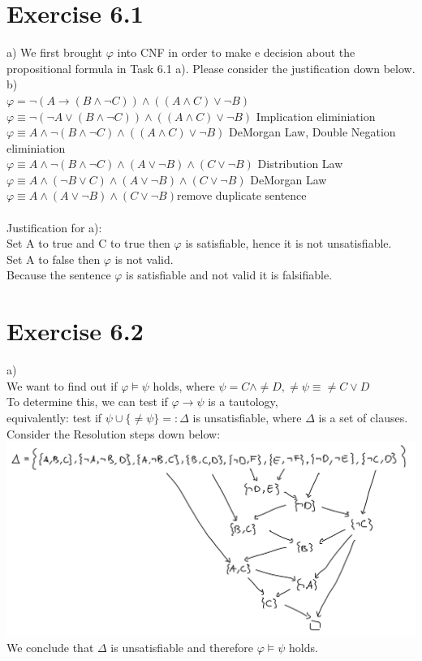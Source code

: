 \documentclass[12pt]{article}
\begin{document}
\section*{Exercise 6.1}
a) We first brought $\varphi$ into CNF in order to make e decision about the propositional formula in Task 6.1 a). Please consider the justification down below.\\
b) \\
$\varphi = \lnot (A \to (B \land \lnot C)) \land ((A \land C ) \lor \lnot B)$\\
$\varphi \equiv \lnot (\lnot A \lor (B \land \lnot C)) \land ((A \land C) \lor \lnot B)$ \qquad Implication eliminiation\\
$\varphi \equiv A \land \lnot (B \land \lnot C) \land ((A \land C) \lor \lnot B)$ \qquad DeMorgan Law, Double Negation eliminiation\\
$\varphi \equiv A \land \lnot (B \land \lnot C) \land (A \lor \lnot B) \land (C \lor \lnot B)$ \qquad Distribution Law\\
$\varphi \equiv A \land (\lnot B \lor C) \land (A \lor \lnot B) \land (C \lor \lnot B)$ \qquad DeMorgan Law\\
$\varphi \equiv A \land (A \lor \lnot B) \land (C \lor \lnot B)$\qquad remove duplicate sentence\\ \\
Justification for a):\\
Set A to true and C to true then $\varphi$ is satisfiable, hence it is not unsatisfiable.\\
Set A to false then $\varphi$ is not valid.\\
Because the sentence $\varphi$ is satisfiable and not valid it is falsifiable.


\section*{Exercise 6.2}
a)\\
We want to find out if $\varphi \vDash \psi$ holds, where $\psi = C \land \neq D, \neq \psi \equiv \neq C \lor D$\\
To determine this, we can test if $\varphi \to \psi$ is a tautology,\\
equivalently: test if $\psi \cup \{\neq \psi \} =: \Delta$ is unsatisfiable, where $\Delta$ is a set of clauses.\\
Consider the Resolution steps down below:\\
\includegraphics[width=\textwidth]{figures/6.2a}\\
We conclude that $\Delta$ is unsatisfiable and therefore $\varphi \vDash \psi$ holds.
\end{document}
